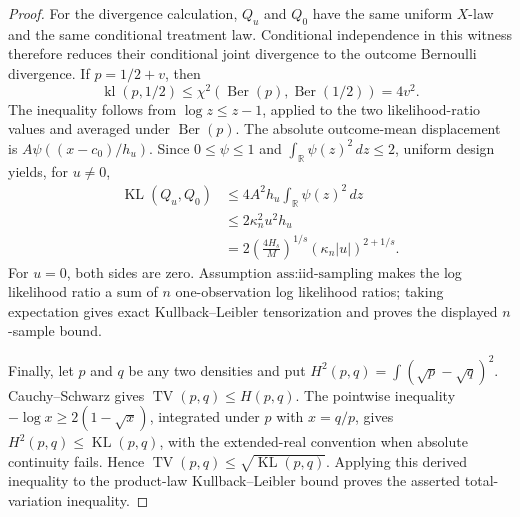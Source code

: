 \documentclass{article}
\begin{document}
\begin{proof}
For the divergence calculation, \(Q_u\) and \(Q_0\) have the same
uniform \(X\)-law and the same conditional treatment law.  Conditional
independence in this witness therefore reduces their conditional joint
divergence to the outcome Bernoulli divergence.  If \(p=1/2+v\), then
\[
 \operatorname{kl}(p,1/2)
 \le \chi^2(\operatorname{Ber}(p),\operatorname{Ber}(1/2))
 =4v^2.
\]
The inequality follows from \(\log z\le z-1\), applied to the two
likelihood-ratio values and averaged under \(\operatorname{Ber}(p)\).
The absolute outcome-mean displacement is
\(A\psi((x-c_0)/h_u)\).  Since \(0\le\psi\le1\) and
\(\int_{\mathbb R}\psi(z)^2\,dz\le2\), uniform design yields, for
\(u\ne0\),
\[
 \begin{aligned}
 \operatorname{KL}(Q_u,Q_0)
 &\le4A^2h_u\int_{\mathbb R}\psi(z)^2\,dz\\
 &\le2\kappa_n^2u^2h_u\\
 &=2\left(\frac{4H_s}{M}\right)^{1/s}
   (\kappa_n|u|)^{2+1/s}.
 \end{aligned}
\]
For \(u=0\), both sides are zero.  Assumption
\(\text{ass:iid-sampling}\) makes the log likelihood ratio a sum of
\(n\) one-observation log likelihood ratios; taking expectation gives
exact Kullback--Leibler tensorization and proves the displayed
\(n\)-sample bound.

Finally, let \(p\) and \(q\) be any two densities and put
\(H^2(p,q)=\int(\sqrt p-\sqrt q)^2\).  Cauchy--Schwarz gives
\(\operatorname{TV}(p,q)\le H(p,q)\).  The pointwise inequality
\(-\log x\ge2(1-\sqrt x)\), integrated under \(p\) with \(x=q/p\),
gives \(H^2(p,q)\le\operatorname{KL}(p,q)\), with the extended-real
convention when absolute continuity fails.  Hence
\(\operatorname{TV}(p,q)\le\sqrt{\operatorname{KL}(p,q)}\).  Applying
this derived inequality to the product-law Kullback--Leibler bound proves
the asserted total-variation inequality.
\end{proof}
\end{document}
